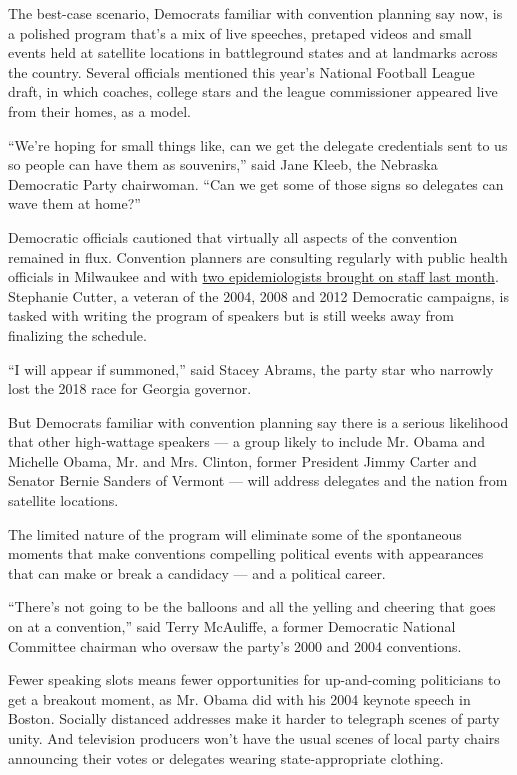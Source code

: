The best-case scenario, Democrats familiar with convention planning say
now, is a polished program that's a mix of live speeches, pretaped
videos and small events held at satellite locations in battleground
states and at landmarks across the country. Several officials mentioned
this year's National Football League draft, in which coaches, college
stars and the league commissioner appeared live from their homes, as a
model.

``We're hoping for small things like, can we get the delegate
credentials sent to us so people can have them as souvenirs,'' said Jane
Kleeb, the Nebraska Democratic Party chairwoman. ``Can we get some of
those signs so delegates can wave them at home?''

Democratic officials cautioned that virtually all aspects of the
convention remained in flux. Convention planners are consulting
regularly with public health officials in Milwaukee and with
\href{https://www.nytimes.com/2020/06/24/us/politics/democratic-convention-milwaukee-coronavirus.html}{two
epidemiologists brought on staff last month}. Stephanie Cutter, a
veteran of the 2004, 2008 and 2012 Democratic campaigns, is tasked with
writing the program of speakers but is still weeks away from finalizing
the schedule.

``I will appear if summoned,'' said Stacey Abrams, the party star who
narrowly lost the 2018 race for Georgia governor.

But Democrats familiar with convention planning say there is a serious
likelihood that other high-wattage speakers --- a group likely to
include Mr. Obama and Michelle Obama, Mr. and Mrs. Clinton, former
President Jimmy Carter and Senator Bernie Sanders of Vermont --- will
address delegates and the nation from satellite locations.

The limited nature of the program will eliminate some of the spontaneous
moments that make conventions compelling political events with
appearances that can make or break a candidacy --- and a political
career.

``There's not going to be the balloons and all the yelling and cheering
that goes on at a convention,'' said Terry McAuliffe, a former
Democratic National Committee chairman who oversaw the party's 2000 and
2004 conventions.

Fewer speaking slots means fewer opportunities for up-and-coming
politicians to get a breakout moment, as Mr. Obama did with his 2004
keynote speech in Boston. Socially distanced addresses make it harder to
telegraph scenes of party unity. And television producers won't have the
usual scenes of local party chairs announcing their votes or delegates
wearing state-appropriate clothing.

